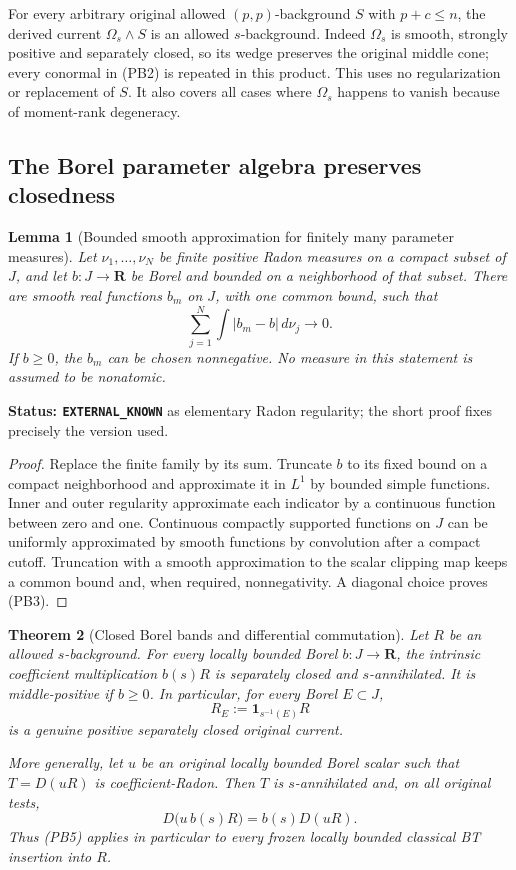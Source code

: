 \documentclass[11pt,a4paper]{article}
\numberwithin{equation}{section}
\newtheorem{theorem}{Theorem}[section]
\newtheorem{lemma}[theorem]{Lemma}
\theoremstyle{definition}
\theoremstyle{remark}
\begin{document}
For every arbitrary original allowed $(p,p)$-background $S$ with
$p+c\le n$, the derived current $\Omega_s\wedge S$ is an allowed
$s$-background. Indeed $\Omega_s$ is smooth, strongly positive and
separately closed, so its wedge preserves the original middle cone;
every conormal in (PB2) is repeated in this product. This uses no
regularization or replacement of $S$. It also covers all cases where
$\Omega_s$ happens to vanish because of moment-rank degeneracy.

\subsection{The Borel parameter algebra preserves closedness}

\begin{lemma}[Bounded smooth approximation for finitely many parameter measures]
\label{lem:r12-parameter-L1-approximation}
Let $\nu_1,\ldots,\nu_N$ be finite positive Radon measures on a
compact subset of $J$, and let $b:J\to\mathbf R$ be Borel and
bounded on a neighborhood of that subset. There are smooth real
functions $b_m$ on $J$, with one common bound, such that
\[
                   \sum_{j=1}^N\int|b_m-b|\,d\nu_j\longrightarrow0.
 \tag{PB3}
\]
If $b\ge0$, the $b_m$ can be chosen nonnegative. No measure in this
statement is assumed to be nonatomic.
\end{lemma}

\noindent\textbf{Status: \texttt{EXTERNAL\_KNOWN}} as elementary
Radon regularity; the short proof fixes precisely the version used.

\begin{proof}
Replace the finite family by its sum. Truncate $b$ to its fixed
bound on a compact neighborhood and approximate it in $L^1$ by
bounded simple functions. Inner and outer regularity approximate
each indicator by a continuous function between zero and one.
Continuous compactly supported functions on $J$ can be uniformly
approximated by smooth functions by convolution after a compact
cutoff. Truncation with a smooth approximation to the scalar
clipping map keeps a common bound and, when required, nonnegativity.
A diagonal choice proves (PB3).
\end{proof}

\begin{theorem}[Closed Borel bands and differential commutation]
\label{thm:r12-closed-parameter-bands}
Let $R$ be an allowed $s$-background. For every locally bounded
Borel $b:J\to\mathbf R$, the intrinsic coefficient multiplication
$b(s)R$ is separately closed and $s$-annihilated. It is middle-positive
if $b\ge0$. In particular, for every Borel $E\subset J$,
\[
                            R_E:=\mathbf1_{s^{-1}(E)}R
 \tag{PB4}
\]
is a genuine positive separately closed original current.

More generally, let $u$ be an original locally bounded Borel scalar
such that $T=D(uR)$ is coefficient-Radon. Then $T$ is $s$-annihilated
and, on all original tests,
\[
                         D\bigl(u\,b(s)R\bigr)=b(s)D(uR).
 \tag{PB5}
\]
Thus (PB5) applies in particular to every frozen locally bounded
classical BT insertion into $R$.
\end{theorem}
\end{document}
